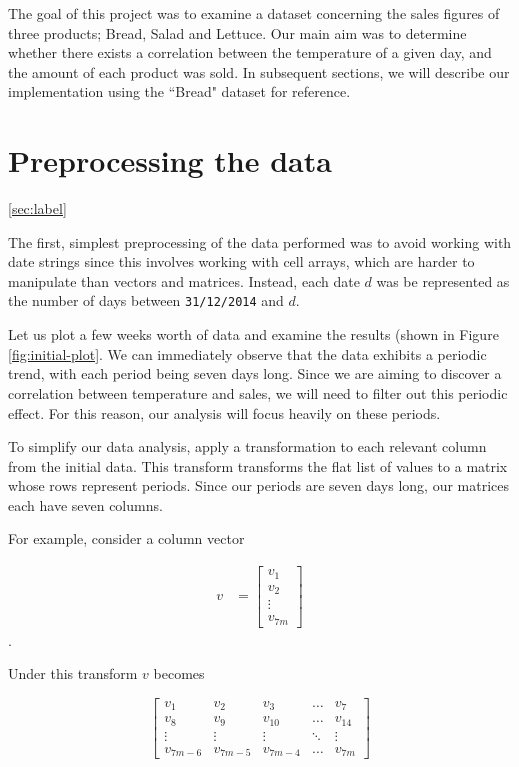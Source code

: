 The goal of this project was to examine a dataset concerning the sales figures of three products; Bread, Salad and Lettuce. Our main aim was to determine whether there exists a correlation between the temperature of a given day, and the amount of each product was sold. In subsequent sections, we will describe our implementation using the ``Bread" dataset for reference.

\section{Preprocessing the data}\ref{sec:label}

The first, simplest preprocessing of the data performed was to avoid working with date strings since this involves working with cell arrays, which are harder to manipulate than vectors and matrices. Instead, each date $d$ was be represented as the number of days between \texttt{31/12/2014} and $d$.

Let us plot a few weeks worth of data and examine the results (shown in Figure \ref{fig:initial-plot}. We can immediately observe that the data exhibits a periodic trend, with each period being seven days long. Since we are aiming to discover a correlation between temperature and sales, we will need to filter out this periodic effect. For this reason, our analysis will focus heavily on these periods.


To simplify our data analysis, apply a transformation to each relevant column from the initial data. This transform transforms the flat list of values to a matrix whose rows represent periods. Since our periods are seven days long, our matrices each have seven columns.

For example, consider a column vector 

\begin{align}
   v &= \begin{bmatrix}
           v_{1} \\
           v_{2} \\
           \vdots \\
           v_{7m}
         \end{bmatrix}
  \end{align}.

Under this transform $v$ becomes

\[
\begin{bmatrix}
    v_{1} & v_{2} & v_{3} & \dots  & v_{7} \\
    v_{8} & v_{9} & v_{10} & \dots  & v_{14} \\
    \vdots & \vdots & \vdots & \ddots & \vdots \\
    v_{7m-6} & v_{7m-5} & v_{7m -4} & \dots  & v_{7m}
\end{bmatrix}
\]

